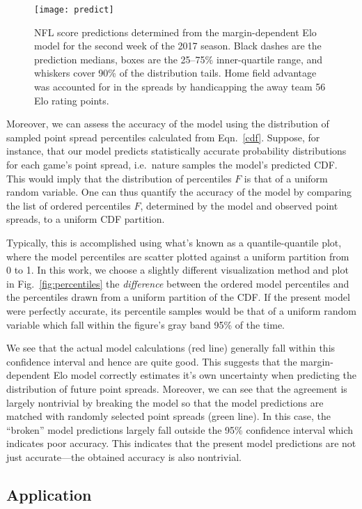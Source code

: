 \documentclass[aps,prc,reprint,amsmath,superscriptaddress]{revtex4-1}
\begin{document}
\begin{figure}
  \texttt{[image: predict]}
  \caption{\label{fig:predict} NFL score predictions determined from the margin-dependent Elo model for the second week of the 2017 season. Black dashes are the prediction medians, boxes are the 25--75\% inner-quartile range, and whiskers cover 90\% of the distribution tails. Home field advantage was accounted for in the spreads by handicapping the away team 56 Elo rating points.}
\end{figure}

Moreover, we can assess the accuracy of the model using the distribution of sampled point spread percentiles calculated from Eqn.~\eqref{cdf}.
Suppose, for instance, that our model predicts statistically accurate probability distributions for each game's point spread, i.e.\ nature samples the model's predicted CDF.
This would imply that the distribution of percentiles $F$ is that of a uniform random variable. 
One can thus quantify the accuracy of the model by comparing the list of ordered percentiles $F$, determined by the model and observed point spreads, to a uniform CDF partition. 

Typically, this is accomplished using what's known as a quantile-quantile plot, where the model percentiles are scatter plotted against a uniform partition from 0 to 1.
In this work, we choose a slightly different visualization method and plot in Fig.~\ref{fig:percentiles} the \emph{difference} between the ordered model percentiles and the percentiles drawn from a uniform partition of the CDF.
If the present model were perfectly accurate, its percentile samples would be that of a uniform random variable which fall within the figure's gray band 95\% of the time.

We see that the actual model calculations (red line) generally fall within this confidence interval and hence are quite good.
This suggests that the margin-dependent Elo model correctly estimates it's own uncertainty when predicting the distribution of future point spreads.
Moreover, we can see that the agreement is largely nontrivial by breaking the model so that the model predictions are matched with randomly selected point spreads (green line).
In this case, the ``broken'' model predictions largely fall outside the 95\% confidence interval which indicates poor accuracy.
This indicates that the present model predictions are not just accurate---the obtained accuracy is also nontrivial.

\subsection{Application}
\end{document}
